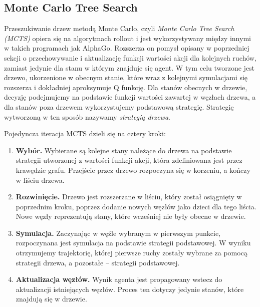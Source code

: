 \documentclass[licencjacka]{pracamgr}
\begin{document}
\subsection{Monte Carlo Tree Search}

Przeszukiwanie drzew metodą Monte Carlo, czyli \emph{Monte Carlo Tree Search (MCTS)} \cite{MCTS} opiera się na algorytmach rollout i jest wykorzystywany między innymi w takich programach jak AlphaGo\cite{alphago2016, alphagozero}. 
Rozszerza on pomysł opisany w poprzedniej sekcji o przechowywanie i aktualizację funkcji wartości akcji dla kolejnych ruchów, zamiast jedynie dla stanu w którym znajduje się agent. W tym celu tworzone jest drzewo, ukorzenione w obecnym stanie, które wraz z kolejnymi symulacjami się rozszerza i dokładniej aproksymuje Q funkcję. Dla stanów obecnych w drzewie, decyzję podejmujemy na podstawie funkcji wartości zawartej w węzłach drzewa, a dla stanów poza drzewem wykorzystujemy podstawową strategię. Strategię wytworzoną w ten sposób nazywamy \emph{strategią drzewa}.

Pojedyncza iteracja MCTS dzieli się na cztery kroki:

\begin{enumerate}
\item \textbf{Wybór.} Wybierane są kolejne stany należące do drzewa na podstawie strategii utworzonej z wartości funkcji akcji, która zdefiniowana jest przez krawędzie grafu. Przejście przez drzewo rozpoczyna się w korzeniu, a kończy w liściu drzewa.
\item \textbf{Rozwinięcie.} Drzewo jest rozszerzane w liściu, który został osiągnięty w poprzednim kroku, poprzez dodanie nowych węzłów jako dzieci dla tego liścia. Nowe węzły reprezentują stany, które wcześniej nie były obecne w drzewie.
\item \textbf{Symulacja.} Zaczynając w węźle wybranym w pierwszym punkcie, rozpoczynana jest symulacja na podstawie strategii podstawowej. W wyniku otrzymujemy trajektorię, której pierwsze ruchy zostały wybrane za pomocą strategii drzewa, a pozostałe -- strategii podstawowej.
\item \textbf{Aktualizacja węzłów.} Wynik agenta jest propagowany wstecz do aktualizacji istniejących węzłów. Proces ten dotyczy jedynie stanów, które znajdują się w drzewie.
\end{enumerate}
\end{document}
